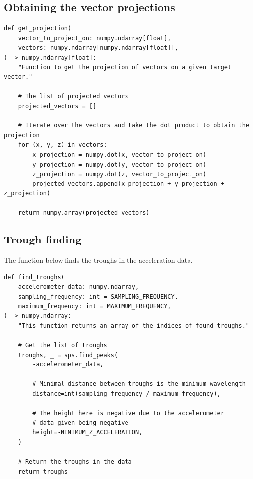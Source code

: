 \documentclass[12pt]{report}
\begin{document}
\subsection{Obtaining the vector projections}
\label{sec:org2c669b0}
\begin{verbatim}
def get_projection(
    vector_to_project_on: numpy.ndarray[float],
    vectors: numpy.ndarray[numpy.ndarray[float]],
) -> numpy.ndarray[float]:
    "Function to get the projection of vectors on a given target vector."

    # The list of projected vectors
    projected_vectors = []

    # Iterate over the vectors and take the dot product to obtain the projection
    for (x, y, z) in vectors:
        x_projection = numpy.dot(x, vector_to_project_on)
        y_projection = numpy.dot(y, vector_to_project_on)
        z_projection = numpy.dot(z, vector_to_project_on)
        projected_vectors.append(x_projection + y_projection + z_projection)

    return numpy.array(projected_vectors)
\end{verbatim}
\subsection{Trough finding}
\label{sec:org5d9ef63}
The function below finds the troughs in the acceleration data.
\begin{verbatim}
def find_troughs(
    accelerometer_data: numpy.ndarray,
    sampling_frequency: int = SAMPLING_FREQUENCY,
    maximum_frequency: int = MAXIMUM_FREQUENCY,
) -> numpy.ndarray:
    "This function returns an array of the indices of found troughs."

    # Get the list of troughs
    troughs, _ = sps.find_peaks(
        -accelerometer_data,

        # Minimal distance between troughs is the minimum wavelength
        distance=int(sampling_frequency / maximum_frequency),

        # The height here is negative due to the accelerometer
        # data given being negative
        height=-MINIMUM_Z_ACCELERATION,
    )

    # Return the troughs in the data
    return troughs
\end{verbatim}
\end{document}
